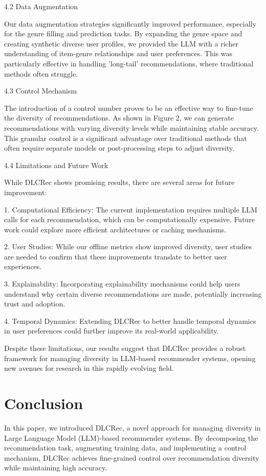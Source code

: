 \documentclass[12pt,letterpaper]{article}
\begin{document}
4.2 Data Augmentation

Our data augmentation strategies significantly improved performance, especially for the genre filling and prediction tasks. By expanding the genre space and creating synthetic diverse user profiles, we provided the LLM with a richer understanding of item-genre relationships and user preferences. This was particularly effective in handling 'long-tail' recommendations, where traditional methods often struggle.

4.3 Control Mechanism

The introduction of a control number proves to be an effective way to fine-tune the diversity of recommendations. As shown in Figure 2, we can generate recommendations with varying diversity levels while maintaining stable accuracy. This granular control is a significant advantage over traditional methods that often require separate models or post-processing steps to adjust diversity.

4.4 Limitations and Future Work

While DLCRec shows promising results, there are several areas for future improvement:

1. Computational Efficiency: The current implementation requires multiple LLM calls for each recommendation, which can be computationally expensive. Future work could explore more efficient architectures or caching mechanisms.

2. User Studies: While our offline metrics show improved diversity, user studies are needed to confirm that these improvements translate to better user experiences.

3. Explainability: Incorporating explainability mechanisms could help users understand why certain diverse recommendations are made, potentially increasing trust and adoption.

4. Temporal Dynamics: Extending DLCRec to better handle temporal dynamics in user preferences could further improve its real-world applicability.

Despite these limitations, our results suggest that DLCRec provides a robust framework for managing diversity in LLM-based recommender systems, opening new avenues for research in this rapidly evolving field.

\section{Conclusion}

In this paper, we introduced DLCRec, a novel approach for managing diversity in Large Language Model (LLM)-based recommender systems. By decomposing the recommendation task, augmenting training data, and implementing a control mechanism, DLCRec achieves fine-grained control over recommendation diversity while maintaining high accuracy.
\end{document}
